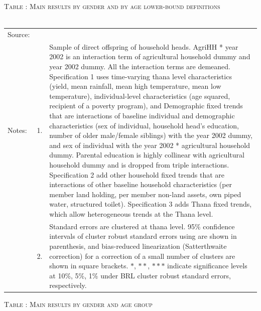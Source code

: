 \documentclass[12pt,letterpaper]{article}
\newcommand{\0}{\ensuremath{\mbox{\boldmath $0$}}}
\begin{document}
{\begin{table}
\hfil\textsc{\footnotesize Table \thetable: Main results by gender and by age lower-bound definitions\label{MainByGenderByAgeLBAgHH0Results}}\\
\setlength{\tabcolsep}{1pt}
\renewcommand{\arraystretch}{.75}
\hspace{-1.0cm}\\
\renewcommand{\arraystretch}{1}
\hfil\begin{tabular}{>{\hfill\scriptsize}p{1cm}<{}>{\hfill\scriptsize}p{.25cm}<{}>{\scriptsize}p{.7\paperwidth}<{\hfill}}
Source:& \multicolumn{2}{l}{\scriptsize Compiled from IFPRI data. }\\[-1ex]
Notes:& 1. & Sample of direct offspring of household heads. \textsf{AgriHH * year 2002} is an interaction term of agricultural household dummy and year 2002 dummy. All the interaction terms are demeaned. Specification 1 uses time-varying thana level characteristics (yield, mean rainfall, mean high temperature, mean low temperature), individual-level characteristics (age squared, recipient of a poverty program), and \textsf{Demographic fixed trends} that are interactions of baseline individual and demographic characteristics (sex of individual, household head's education, number of older male/female siblings) with the year 2002 dummy, and sex of individual with the year 2002 * agricultural household dummy. Parental education is highly collinear with agricultural household dummy and is dropped from triple interactions.  Specification 2 add \textsf{other household fixed trends} that are interactions of other baseline household characteristics (per member land holding, per member non-land assets, own piped water, structured toilet). Specification 3 adds \textsf{Thana fixed trends}, which allow heterogeneous trends at the Thana level. \\[-1ex]
& 2. & Standard errors are clustered at thana level. 95\% confidence intervals of cluster robust standard errors using \cite{liang1986longitudinal} are shown in parenthesis, and bias-reduced linearization (Satterthwaite correction) for a correction of a small number of clusters are shown in square brackets. $*$, $**$, $***$ indicate significance levels at 10\%, 5\%, 1\% under BRL cluster robust standard errors, respectively.\end{tabular}
\end{table}

\begin{table}
\hfil\textsc{\footnotesize Table \thetable: Main results by gender and age group\label{MainGenderAgeGroup2ResultsWithInteractions}}\\
\setlength{\tabcolsep}{1pt}
\renewcommand{\arraystretch}{.55}
\hspace{-1cm}


\end{table}}
\end{document}
